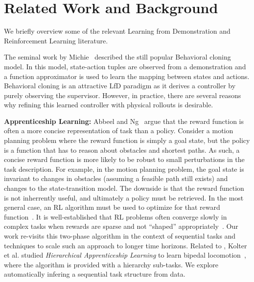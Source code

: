 %
\section{Related Work and Background}
We briefly overview some of the relevant Learning from Demonstration and Reinforcement Learning literature.

The seminal work by Michie~\cite{michie1996behavioural} described the still popular Behavioral cloning model.
In this model, state-action tuples are observed from a demonstration and a function approximator is used to learn the mapping
between states and actions.
Behavioral cloning is an attractive LfD paradigm as it derives a controller by purely observing the supervisor.
However, in practice, there are several reasons why refining this learned controller with physical rollouts is desirable.

\vspace{0.5em}\noindent\textbf{Apprenticeship Learning: } Abbeel and Ng~\cite{ng2000algorithms, abbeel2004apprenticeship} argue that the reward function is often a more concise representation of task than a policy. Consider a motion planning problem where the reward function is simply a goal state, but the policy is a function that has to reason about obstacles and shortest paths. As such, a concise reward function is more likely to be robust to small perturbations in the task description. For example, in the motion planning problem, the goal state is invariant to changes in obstacles (assuming a feasible path still exists) and changes to the state-transition model. 
The downside is that the reward function is not inherrently useful, and ultimately a policy must be retrieved. In the most general case, an RL algorithm must be used to optimize for that reward function~\cite{abbeel2004apprenticeship}.
It is well-established that RL problems often converge slowly in complex tasks when rewards are sparse and not ``shaped'' appropriately~\cite{DBLP:conf/icml/NgHR99, DBLP:conf/aaai/JudahFTG14}.
Our work re-visits this two-phase algorithm in the context of sequential tasks and techniques to scale such an approach to longer time horizons.
Related to \hirl, Kolter et al. studied  \emph{Hierarchical Apprenticeship Learning} to learn bipedal locomotion~\cite{DBLP:conf/nips/KolterAN07}, where the algorithm is provided with a hierarchy sub-tasks.
We explore automatically infering a sequential task structure from data.

